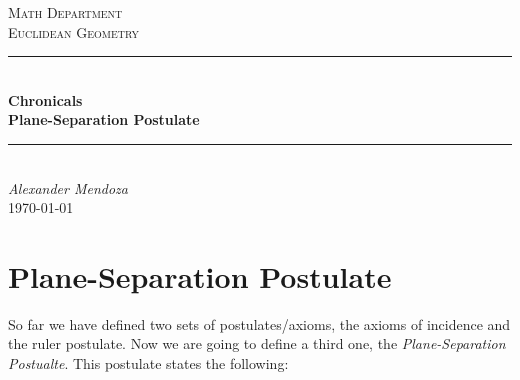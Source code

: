\documentclass[11pt]{article}
\begin{document}
    \begin{titlepage}

        \newcommand{\HRule}{\rule{\linewidth}{0.5mm}}
        \newcommand{\department}{Math Department}
        \newcommand{\course}{Euclidean Geometry}
        \newcommand{\titleValue}{Chronicals}
        \newcommand{\subtitleValue}{Plane-Separation Postulate}
        \newcommand{\authorName}{Alexander Mendoza}

        \center


        \vspace{0.5cm}
        \textsc{\Large \department}\\[0.5cm]
        \textsc{\Large \course}\\[0.5cm]
        \vfill


        \HRule\\
        \Huge
        \textbf{\titleValue}\\[0.5cm]
        \Large
        \textbf{\subtitleValue}\\
        \HRule\\[0.5cm]


        \vfill
        \Large
        \textit{\authorName}\\
        {\large \today}\\[2cm]

    \end{titlepage}
\section{Plane-Separation Postulate}
    So far we have defined two sets of postulates/axioms, the axioms of incidence and the ruler postulate. Now we are going to define a third one, the \textit{Plane-Separation Postualte}. This postulate states the following:\\
\end{document}
